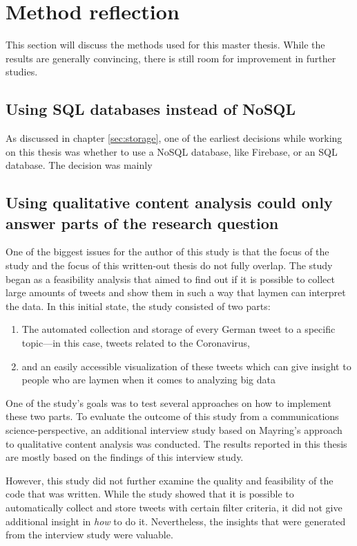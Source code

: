 \section{Method reflection}
This section will discuss the methods used for this master thesis. While the results are generally convincing, there is still room for improvement in further studies.

\subsection*{Using SQL databases instead of NoSQL}
As discussed in chapter \ref{sec:storage}, one of the earliest decisions while working on this thesis was whether to use a NoSQL database, like Firebase, or an SQL database. The decision was mainly

\subsection*{Using qualitative content analysis could only answer parts of the research question}
One of the biggest issues for the author of this study is that the focus of the study and the focus of this written-out thesis do not fully overlap. The study began as a feasibility analysis that aimed to find out if it is possible to collect large amounts of tweets and show them in such a way that laymen can interpret the data. In this initial state, the study consisted of two parts:

\begin{enumerate}
    \item The automated collection and storage of every German tweet to a specific topic---in this case, tweets related to the Coronavirus,
    \item and an easily accessible visualization of these tweets which can give insight to people who are laymen when it comes to analyzing big data
\end{enumerate}

One of the study's goals was to test several approaches on how to implement these two parts. To evaluate the outcome of this study from a communications science-perspective, an additional interview study based on Mayring's approach to qualitative content analysis was conducted. The results reported in this thesis are mostly based on the findings of this interview study.

However, this study did not further examine the quality and feasibility of the code that was written. While the study showed that it is possible to automatically collect and store tweets with certain filter criteria, it did not give additional insight in \emph{how} to do it. Nevertheless, the insights that were generated from the interview study were valuable.

